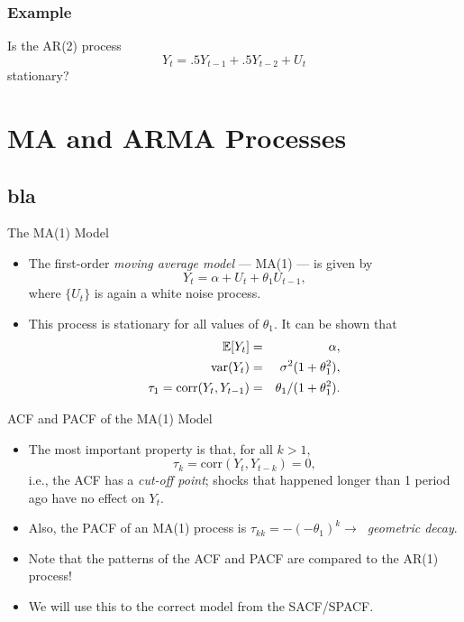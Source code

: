 \begin{frame}\frametitle{Example}
Is the AR(2) process
\[
Y_t= .5Y_{t-1}+.5Y_{t-2}+U_t
\]
stationary?
\end{frame}
\section{MA and ARMA Processes}\subsection*{bla}
\begin{frame}{The MA(1) Model}
\begin{itemize}
\item The first-order \emph{\color{red}moving average model} --- MA(1) --- is given by
\begin{equation*}
Y_t=\alpha + U_t + \theta_1 U_{t-1},
\end{equation*}
where $\{U_t\}$ is again a white noise process.
\item This process is stationary for
all values of $\theta_1 $. It can be shown that
\begin{eqnarray*}
{\mathbb E}[Y_t] &=& \alpha, \\
\mathrm{var}(Y_t) &=& \sigma ^2 (1 + \theta_1 ^2), \\
\tau_1 = \mathrm{corr}(Y_t,Y_{t-1}) & = & \theta_1/(1 + \theta_1 ^2).
\end{eqnarray*}
\end{itemize}
\end{frame}
\begin{frame}{ACF and PACF of the MA(1) Model}
\begin{itemize}
\item The most important property is that, for all $k>1$,
\begin{equation*}
\tau_k = \mathrm{corr}(Y_t,Y_{t-k})=0,
\end{equation*}
i.e., the ACF has a \emph{\color{red}cut-off point}; shocks that happened longer than 1 period ago have no
effect on $Y_t$.
\item Also, the PACF of an MA(1) process is $\tau_{kk} =
-(-\theta_1)^k\rightarrow\;\;$\emph{\color{red}geometric decay}.
\item Note that the patterns of the ACF and PACF are  compared to the AR(1) process!
\item We will use this to  the correct model from the SACF/SPACF.

\end{itemize}
\end{frame}

